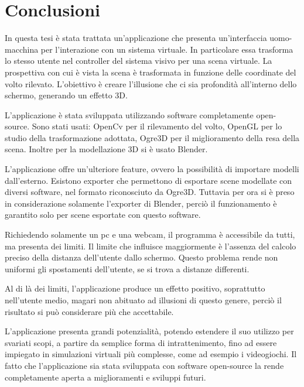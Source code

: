 
\chapter*{Conclusioni}
In questa tesi è stata trattata un'applicazione che presenta un'interfaccia uomo-macchina per l'interazione con un sistema virtuale. In particolare essa trasforma lo stesso utente nel controller del sistema visivo per una scena virtuale. La prospettiva con cui è vista la scena è trasformata in funzione delle coordinate del volto rilevato. L'obiettivo è creare l'illusione che ci sia profondità all'interno dello schermo, generando un effetto 3D.

L'applicazione è stata sviluppata utilizzando software completamente open-source. Sono stati usati:
OpenCv per il rilevamento del volto, OpenGL per lo studio della trasformazione adottata, Ogre3D per il miglioramento della resa della scena. Inoltre per la modellazione 3D si è usato Blender.

L'applicazione offre un'ulteriore feature, ovvero la possibilità di importare modelli dall'esterno. Esistono exporter che permettono di esportare scene modellate con diversi software, nel formato riconosciuto da Ogre3D. Tuttavia per ora si è preso in considerazione solamente l'exporter di Blender, perciò il funzionamento è garantito solo per scene esportate con questo software.

Richiedendo solamente un pc e una webcam, il programma è accessibile da tutti, ma presenta dei limiti. Il limite che influisce maggiormente è l'assenza del calcolo preciso della distanza dell'utente dallo schermo. Questo problema rende non uniformi gli spostamenti dell'utente, se si trova a distanze differenti.

Al di là dei limiti, l'applicazione produce un effetto positivo, soprattutto nell'utente medio, magari non abituato ad illusioni di questo genere, perciò il risultato si può considerare più che accettabile.

L'applicazione presenta grandi potenzialità, potendo estendere il suo utilizzo per svariati scopi, a partire da semplice forma di intrattenimento, fino ad essere impiegato in simulazioni virtuali più complesse, come ad esempio i videogiochi. Il fatto che l'applicazione sia stata sviluppata con software open-source la rende completamente aperta a miglioramenti e sviluppi futuri. 

